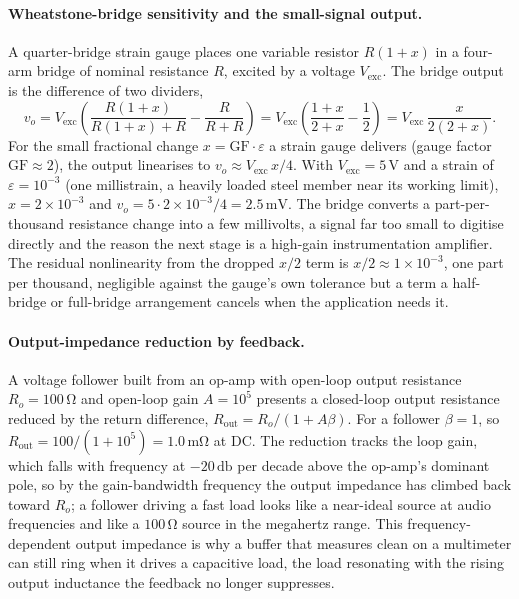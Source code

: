 \paragraph{Wheatstone-bridge sensitivity and the small-signal output.}
A quarter-bridge strain gauge places one variable resistor $R(1+x)$ in a
four-arm bridge of nominal resistance $R$, excited by a voltage $V_{\text{exc}}$.
The bridge output is the difference of two dividers,
\[
v_o = V_{\text{exc}}\left(\frac{R(1+x)}{R(1+x)+R} - \frac{R}{R+R}\right)
= V_{\text{exc}}\left(\frac{1+x}{2+x} - \frac{1}{2}\right)
= V_{\text{exc}}\,\frac{x}{2(2+x)}.
\]
For the small fractional change $x = \text{GF}\cdot\varepsilon$ a strain gauge
delivers (gauge factor $\text{GF}\approx 2$), the output linearises to
$v_o \approx V_{\text{exc}}\,x/4$. With $V_{\text{exc}} = 5\,\si{\volt}$ and a
strain of $\varepsilon = 10^{-3}$ (one millistrain, a heavily loaded steel
member near its working limit), $x = 2\times 10^{-3}$ and $v_o = 5\cdot
2\times 10^{-3}/4 = 2.5\,\si{\milli\volt}$. The bridge converts a part-per-
thousand resistance change into a few millivolts, a signal far too small to
digitise directly and the reason the next stage is a high-gain instrumentation
amplifier. The residual nonlinearity from the dropped $x/2$ term is
$x/2 \approx 1\times 10^{-3}$, one part per thousand, negligible against
the gauge's own tolerance but a term a half-bridge or full-bridge arrangement
cancels when the application needs it.

\paragraph{Output-impedance reduction by feedback.}
A voltage follower built from an op-amp with open-loop output resistance
$R_{o} = 100\,\si{\ohm}$ and open-loop gain $A = 10^{5}$ presents a
closed-loop output resistance reduced by the return difference,
$R_{\text{out}} = R_{o}/(1 + A\beta)$. For a follower $\beta = 1$, so
$R_{\text{out}} = 100/(1 + 10^{5}) = 1.0\,\si{\milli\ohm}$ at DC. The
reduction tracks the loop gain, which falls with frequency at
$-20\,\si{\decibel}$ per decade above the op-amp's dominant pole, so by the
gain-bandwidth frequency the output impedance has climbed back toward $R_o$;
a follower driving a fast load looks like a near-ideal source at audio
frequencies and like a $100\,\si{\ohm}$ source in the megahertz range. This
frequency-dependent output impedance is why a buffer that measures clean on a
multimeter can still ring when it drives a capacitive load, the load
resonating with the rising output inductance the feedback no longer
suppresses.

